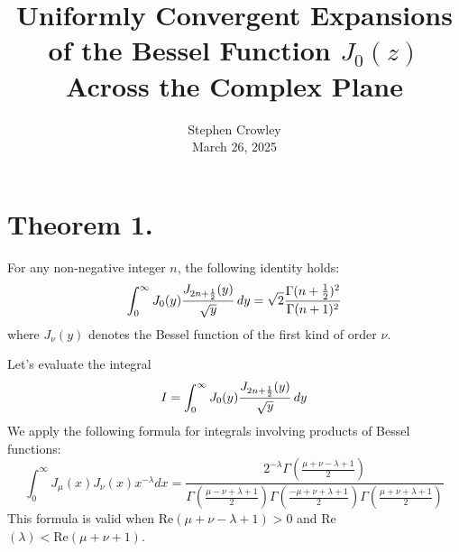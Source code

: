 \documentclass{article}
\newcommand{\tmaffiliation}[1]{\\ #1}
\newcommand{\tmtextbf}[1]{\text{{\bfseries{#1}}}}
\begin{document}
\title{\section*{Uniformly Convergent Expansions of the Bessel Function $J_0
(z)$ Across the Complex Plane}}

\author{
  Stephen Crowley
  \tmaffiliation{March 26, 2025}
}

\maketitle

{\tableofcontents}

\section*{Theorem 1.}

For any non-negative integer $n$, the following identity holds:
\[ \int_0^{\infty} J_0 (y) \frac{J_{2 n + \frac{1}{2}} (y)}{\sqrt{y}} 
   \hspace{0.17em} dy = \sqrt{2}  \frac{\Gamma (n + \frac{1}{2})^2}{\Gamma (n
   + 1)^2} \]
where $J_{\nu} (y)$ denotes the Bessel function of the first kind of order
$\nu$.

\tmtextbf{Proof.} Let's evaluate the integral
\[ I = \int_0^{\infty} J_0 (y) \frac{J_{2 n + \frac{1}{2}} (y)}{\sqrt{y}} 
   \hspace{0.17em} dy \]
We apply the following formula for integrals involving products of Bessel
functions:
\[ \int_0^{\infty} J_{\mu} (x) J_{\nu} (x) x^{- \lambda} dx = \frac{2^{-
   \lambda} \Gamma \left( \frac{\mu + \nu - \lambda + 1}{2} \right)}{\Gamma
   \left( \frac{\mu - \nu + \lambda + 1}{2} \right) \Gamma \left( \frac{- \mu
   + \nu + \lambda + 1}{2} \right) \Gamma \left( \frac{\mu + \nu + \lambda +
   1}{2} \right)} \]
This formula is valid when Re$(\mu + \nu - \lambda + 1) > 0$ and Re$(\lambda)
< \text{Re} (\mu + \nu + 1)$.
\end{document}
